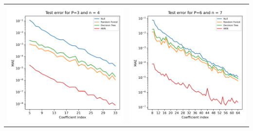 \documentclass[a1paper]{tikzposter}
\begin{document}
\begin{columns}
{{\begin{center}
\begin{tabular}{cc}
\begin{minipage}{0.16\textwidth}
                \end{minipage} \\
                \begin{minipage}{0.16\textwidth}
                    \includegraphics[width=\linewidth]{Images/MLP3n4.png}
                \end{minipage} &
                \begin{minipage}{0.16\textwidth}
                    \includegraphics[width=\linewidth]{Images/MLP6n7.png}
                \end{minipage}
            \end{tabular}
        \end{center}

}}
\end{columns}
\end{document}
